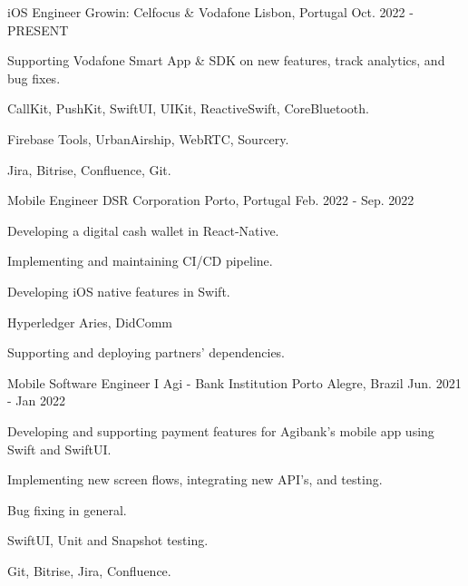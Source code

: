 

\begin{cventries}
  \cventry
    {iOS Engineer} %
    {Growin: Celfocus \& Vodafone} %
    {Lisbon, Portugal} %
    {Oct. 2022 - PRESENT} %
    {
    \begin{cvitems} %
      \item {Supporting Vodafone Smart App \& SDK on new features, track analytics, and bug fixes.}
      \item {CallKit, PushKit, SwiftUI, UIKit, ReactiveSwift, CoreBluetooth.}
      \item {Firebase Tools, UrbanAirship, WebRTC, Sourcery.}
      \item {Jira, Bitrise, Confluence, Git.}
    \end{cvitems}
    }
    \cventry
      {Mobile Engineer} %
      {DSR Corporation} %
      {Porto, Portugal} %
      {Feb. 2022 - Sep. 2022} %
      {
      \begin{cvitems} %
        \item {Developing a digital cash wallet in React-Native.}
        \item {Implementing and maintaining CI/CD pipeline.}
        \item {Developing iOS native features in Swift.}
        \item {Hyperledger Aries, DidComm}
        \item {Supporting and deploying partners' dependencies.}
      \end{cvitems}
      }

    \cventry
      {Mobile Software Engineer I} %
      {Agi - Bank Institution} %
      {Porto Alegre, Brazil} %
      {Jun. 2021 - Jan 2022} %
      {
      \begin{cvitems} %
        \item {Developing and supporting payment features for Agibank's mobile app using Swift and SwiftUI.}
        \item {Implementing new screen flows, integrating new API's, and testing.}
        \item {Bug fixing in general.}
        \item {SwiftUI, Unit and Snapshot testing.}
        \item {Git, Bitrise, Jira, Confluence.}
      \end{cvitems}
      }


\end{cventries}
